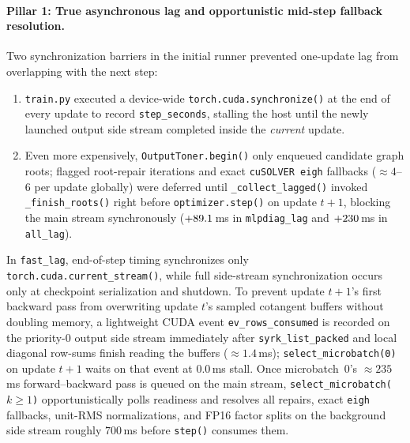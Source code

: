 \paragraph{Pillar 1: True asynchronous lag and opportunistic mid-step fallback resolution.}
Two synchronization barriers in the initial runner prevented one-update lag
from overlapping with the next step:
\begin{enumerate}
\item \texttt{train.py} executed a device-wide \texttt{torch.cuda.synchronize()}
  at the end of every update to record \texttt{step\_seconds}, stalling the
  host until the newly launched output side stream completed inside the
  \emph{current} update.
\item Even more expensively, \texttt{OutputToner.begin()} only enqueued
  candidate graph roots; flagged root-repair iterations and exact
  \texttt{cuSOLVER eigh} fallbacks ($\approx 4$--$6$ per update globally) were
  deferred until \texttt{\_collect\_lagged()} invoked \texttt{\_finish\_roots()}
  right before \texttt{optimizer.step()} on update $t+1$, blocking the main
  stream synchronously ($+89.1$\,ms in \texttt{mlpdiag\_lag}
  and $+230$\,ms in \texttt{all\_lag}).
\end{enumerate}
In \texttt{fast\_lag}, end-of-step timing synchronizes only
\texttt{torch.cuda.current\_stream()}, while full side-stream synchronization
occurs only at checkpoint serialization and shutdown. To prevent update $t+1$'s
first backward pass from overwriting update $t$'s sampled cotangent buffers
without doubling memory, a lightweight CUDA event \texttt{ev\_rows\_consumed} is
recorded on the priority-0 output side stream immediately after
\texttt{syrk\_list\_packed} and local diagonal row-sums finish reading the
buffers ($\approx 1.4$\,ms); \texttt{select\_microbatch(0)} on update $t+1$
waits on that event at $0.0$\,ms stall. Once microbatch~0's $\approx 235$\,ms
forward--backward pass is queued on the main stream,
\texttt{select\_microbatch($k\ge 1$)} opportunistically polls readiness and
resolves all repairs, exact \texttt{eigh} fallbacks, unit-RMS normalizations,
and FP16 factor splits on the background side stream roughly $700$\,ms before
\texttt{step()} consumes them.

